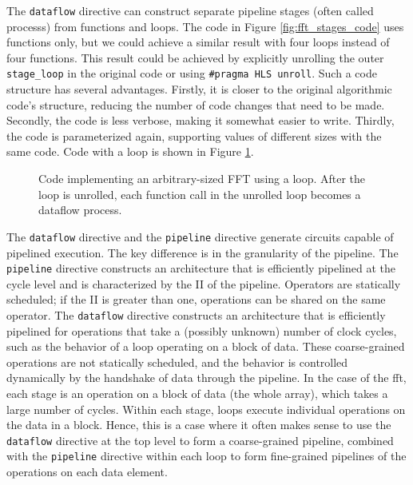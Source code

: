 The \lstinline|dataflow| directive can construct separate pipeline stages (often called \glspl{process}) from functions and loops. The code in Figure \ref{fig:fft_stages_code} uses functions only, but we could achieve a similar result with four loops instead of four functions.  This result could be achieved by explicitly unrolling the outer \lstinline|stage_loop| in the original code or using \lstinline|#pragma HLS unroll|.  Such a code structure has several advantages.  Firstly, it is closer to the original algorithmic code's structure, reducing the number of code changes that need to be made.   Secondly, the code is less verbose, making it somewhat easier to write.  Thirdly, the code is parameterized again, supporting values of different sizes with the same code.  Code with a loop is shown in Figure \ref{fig:fft_stages_loop_code}.

\begin{figure}

\caption{Code implementing an arbitrary-sized FFT using a loop. After the loop is unrolled, each function call in the unrolled loop becomes a dataflow process. }
\label{fig:fft_stages_loop_code}
\end{figure}

The \lstinline{dataflow} directive and the \lstinline{pipeline} directive generate circuits capable of pipelined execution.  The key difference is in the granularity of the pipeline. The \lstinline{pipeline} directive constructs an architecture that is efficiently pipelined at the cycle level and is characterized by the II of the pipeline.  Operators are statically scheduled; if the II is greater than one, operations can be shared on the same operator.  The \lstinline{dataflow} directive constructs an architecture that is efficiently pipelined for operations that take a (possibly unknown) number of clock cycles, such as the behavior of a loop operating on a block of data.  These coarse-grained operations are not statically scheduled, and the behavior is controlled dynamically by the handshake of data through the pipeline.  In the case of the \gls{fft}, each stage is an operation on a block of data (the whole array), which takes a large number of cycles.  Within each stage, loops execute individual operations on the data in a block.  Hence, this is a case where it often makes sense to use the \lstinline|dataflow| directive at the top level to form a coarse-grained pipeline, combined with the \lstinline|pipeline| directive within each loop to form fine-grained pipelines of the operations on each data element.

